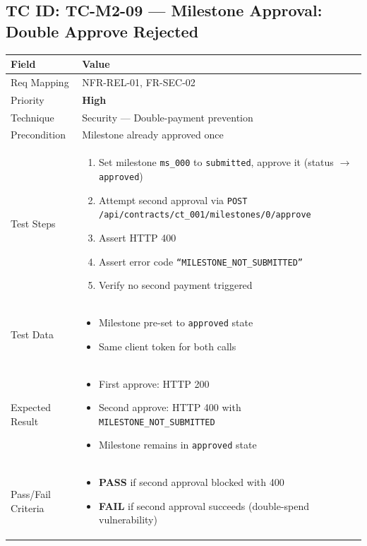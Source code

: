 \documentclass[12pt,a4paper]{article}
\newcommand{\sevhigh}{\textcolor{severityhigh}{\textbf{High}}}
\newcommand{\passresult}{\textcolor{passgreen}{\textbf{PASS}}}
\newcommand{\failresult}{\textcolor{failred}{\textbf{FAIL}}}
\begin{document}
\vspace{0.8cm}

\subsection{TC ID: TC-M2-09 --- Milestone Approval: Double Approve Rejected}

\begin{tabular}{|p{}|p{}|}
\hline
\rowcolor{lightblue} \textbf{Field} & \textbf{Value} \\
\hline
Req Mapping & NFR-REL-01, FR-SEC-02 \\
\hline
Priority & \sevhigh \\
\hline
Technique & Security --- Double-payment prevention \\
\hline
Precondition & Milestone already approved once \\
\hline
Test Steps &
\begin{enumerate}[nosep, leftmargin=*]
  \item Set milestone \texttt{ms\_000} to \texttt{submitted}, approve it (status $\rightarrow$ \texttt{approved})
  \item Attempt second approval via \texttt{POST /api/contracts/ct\_001/milestones/0/approve}
  \item Assert HTTP 400
  \item Assert error code \texttt{``MILESTONE\_NOT\_SUBMITTED''}
  \item Verify no second payment triggered
\end{enumerate} \\
\hline
Test Data &
\begin{itemize}[nosep, leftmargin=*]
  \item Milestone pre-set to \texttt{approved} state
  \item Same client token for both calls
\end{itemize} \\
\hline
Expected Result &
\begin{itemize}[nosep, leftmargin=*]
  \item First approve: HTTP 200
  \item Second approve: HTTP 400 with \texttt{MILESTONE\_NOT\_SUBMITTED}
  \item Milestone remains in \texttt{approved} state
\end{itemize} \\
\hline
Pass/Fail Criteria &
\begin{itemize}[nosep, leftmargin=*]
  \item \passresult{} if second approval blocked with 400
  \item \failresult{} if second approval succeeds (double-spend vulnerability)
\end{itemize} \\
\hline
\end{tabular}
\end{document}
